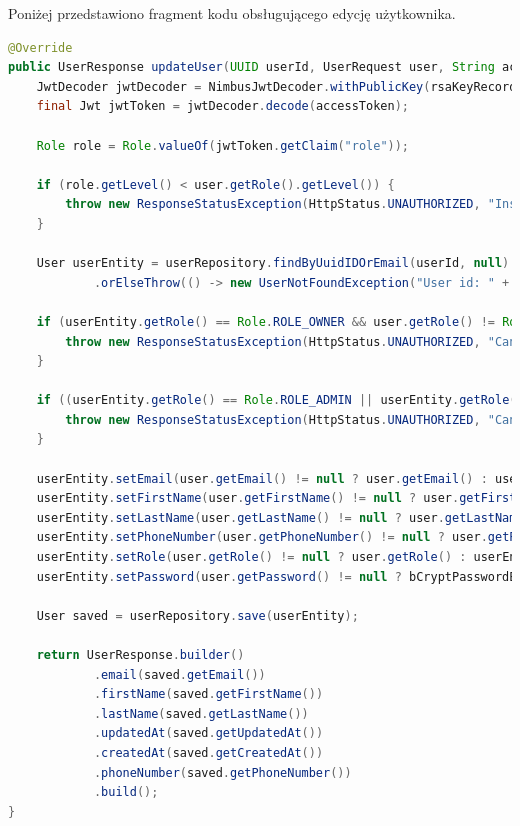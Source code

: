 \noindent Poniżej przedstawiono fragment kodu obsługującego edycję użytkownika.
\begin{lstlisting}[language=Java, style=JavaStyle, caption=Edycja użytkownika w \texttt{UserServiceImp}]
@Override
public UserResponse updateUser(UUID userId, UserRequest user, String accessToken) throws UserNotFoundException {
    JwtDecoder jwtDecoder = NimbusJwtDecoder.withPublicKey(rsaKeyRecord.publicKey()).build();
    final Jwt jwtToken = jwtDecoder.decode(accessToken);

    Role role = Role.valueOf(jwtToken.getClaim("role"));

    if (role.getLevel() < user.getRole().getLevel()) {
        throw new ResponseStatusException(HttpStatus.UNAUTHORIZED, "Insufficient permissions to update or assign the role");
    }

    User userEntity = userRepository.findByUuidIDOrEmail(userId, null)
            .orElseThrow(() -> new UserNotFoundException("User id: " + userId + " not found"));

    if (userEntity.getRole() == Role.ROLE_OWNER && user.getRole() != Role.ROLE_OWNER) {
        throw new ResponseStatusException(HttpStatus.UNAUTHORIZED, "Cannot change the role of an OWNER");
    }

    if ((userEntity.getRole() == Role.ROLE_ADMIN || userEntity.getRole() == Role.ROLE_EMPLOYEE) && user.getRole() == Role.ROLE_OWNER) {
        throw new ResponseStatusException(HttpStatus.UNAUTHORIZED, "Cannot change the role to OWNER");
    }

    userEntity.setEmail(user.getEmail() != null ? user.getEmail() : userEntity.getEmail());
    userEntity.setFirstName(user.getFirstName() != null ? user.getFirstName() : userEntity.getFirstName());
    userEntity.setLastName(user.getLastName() != null ? user.getLastName() : userEntity.getLastName());
    userEntity.setPhoneNumber(user.getPhoneNumber() != null ? user.getPhoneNumber() : userEntity.getPhoneNumber());
    userEntity.setRole(user.getRole() != null ? user.getRole() : userEntity.getRole());
    userEntity.setPassword(user.getPassword() != null ? bCryptPasswordEncoder.encode(user.getPassword()) : userEntity.getPassword());

    User saved = userRepository.save(userEntity);

    return UserResponse.builder()
            .email(saved.getEmail())
            .firstName(saved.getFirstName())
            .lastName(saved.getLastName())
            .updatedAt(saved.getUpdatedAt())
            .createdAt(saved.getCreatedAt())
            .phoneNumber(saved.getPhoneNumber())
            .build();
}
\end{lstlisting}

